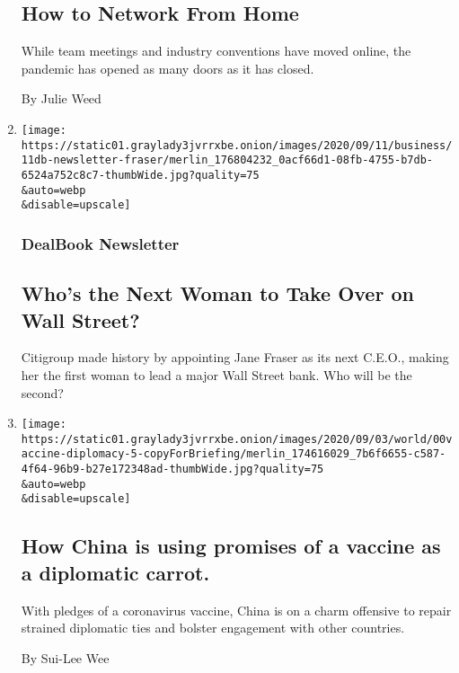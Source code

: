 \begin{enumerate}
  \hypertarget{how-to-network-from-home}{%
  \subsection{How to Network From Home}\label{how-to-network-from-home}}

  While team meetings and industry conventions have moved online, the
  pandemic has opened as many doors as it has closed.

  By Julie Weed
\item
  \href{/2020/09/11/business/dealbook/women-wall-street-citigroup.html}{}

  \texttt{[image: https://static01.graylady3jvrrxbe.onion/images/2020/09/11/business/11db-newsletter-fraser/merlin\_176804232\_0acf66d1-08fb-4755-b7db-6524a752c8c7-thumbWide.jpg?quality=75\\\&auto=webp\\\&disable=upscale]}

  \hypertarget{dealbook-newsletter}{%
  \subsubsection{DealBook Newsletter}\label{dealbook-newsletter}}

  \hypertarget{whos-the-next-woman-to-take-over-on-wall-street}{%
  \subsection{Who's the Next Woman to Take Over on Wall
  Street?}\label{whos-the-next-woman-to-take-over-on-wall-street}}

  Citigroup made history by appointing Jane Fraser as its next C.E.O.,
  making her the first woman to lead a major Wall Street bank. Who will
  be the second?
\item
  \href{/2020/09/11/business/how-china-is-using-promises-of-a-vaccine-as-a-diplomatic-carrot.html}{}

  \texttt{[image: https://static01.graylady3jvrrxbe.onion/images/2020/09/03/world/00vaccine-diplomacy-5-copyForBriefing/merlin\_174616029\_7b6f6655-c587-4f64-96b9-b27e172348ad-thumbWide.jpg?quality=75\\\&auto=webp\\\&disable=upscale]}

  \hypertarget{how-china-is-using-promises-of-a-vaccine-as-a-diplomatic-carrot}{%
  \subsection{How China is using promises of a vaccine as a diplomatic
  carrot.}\label{how-china-is-using-promises-of-a-vaccine-as-a-diplomatic-carrot}}

  With pledges of a coronavirus vaccine, China is on a charm offensive
  to repair strained diplomatic ties and bolster engagement with other
  countries.

  By Sui-Lee Wee
\end{enumerate}

